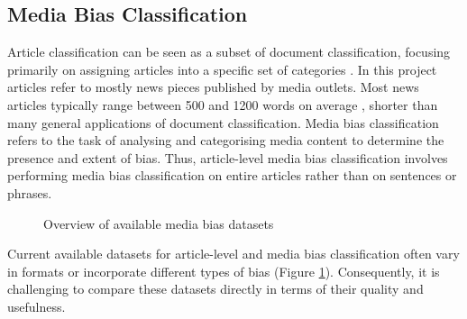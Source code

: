 \subsection{Media Bias Classification}

Article classification can be seen as a subset of document classification, focusing primarily on assigning articles into a specific set of categories \cite{dien-2019-article-classification}. In this project articles refer to mostly news pieces published by media outlets. Most news articles typically range between 500 and 1200 words on average \cite{newswhip-2013-article-length}, shorter than many general applications of document classification. Media bias classification refers to the task of analysing and categorising media content to determine the presence and extent of bias. Thus, article-level media bias classification involves performing media bias classification on entire articles rather than on sentences or phrases.

\begin{figure}[htbp]
    \centering
    \caption{Overview of available media bias datasets \cite{rodrigo-2024-systematic-review-media-bias}}
    \label{fig:media-bias-datasets-overview}
\end{figure}


Current available datasets for article-level and media bias classification often vary in formats or incorporate different types of bias \cite{rodrigo-2024-systematic-review-media-bias} (Figure \ref{fig:media-bias-datasets-overview}). Consequently, it is challenging to compare these datasets directly in terms of their quality and usefulness.

